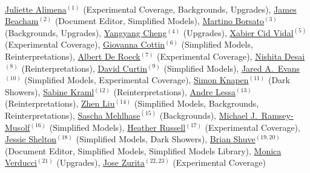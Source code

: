 

\\

\noindent  \href{mailto:juliette.alimena@cern.ch}{Juliette Alimena}$^{(1)}$ (Experimental Coverage, Backgrounds, Upgrades), \href{mailto:j.beacham@cern.ch}{James Beacham}$^{(2)}$ (Document Editor, Simplified Models), \href{mailto:martino.borsato@cern.ch}{Martino Borsato}$^{(3)}$ (Backgrounds, Upgrades),
\href{mailto:yangyang.cheng@cornell.edu}{Yangyang Cheng}$^{(4)}$ (Upgrades), \href{mailto:xabier.cid.vidal@cern.ch}{Xabier Cid Vidal}$^{(5)}$ (Experimental Coverage), \href{mailto:gcottin@phys.ntu.edu.tw}{Giovanna Cottin}$^{(6)}$ (Simplified Models, Reinterpretations), \href{mailto:deroeck@mail.cern.ch}{Albert De Roeck}$^{(7)}$ (Experimental Coverage), \href{mailto:ddesai@theory.tifr.res.in}{Nishita Desai}$^{(8)}$ (Reinterpretations), \href{mailto:dcurtin@physics.utoronto.ca}{David Curtin}$^{(9)}$ (Simplified Models), \href{mailto:jaredaevans@gmail.com}{Jared A.~Evans}$^{(10)}$ (Simplified Models, Experimental Coverage), \href{mailto:knapen@ias.edu}{Simon Knapen}$^{(11)}$ (Dark Showers), \href{mailto:sabine.kraml@lpsc.in2p3.fr}{Sabine Kraml}$^{(12)}$ (Reinterpretations), \href{mailto:andre.lessa@ufabc.edu.br}{Andre Lessa}$^{(13)}$ (Reinterpretations),  \href{mailto:zliuphys@umd.edu}{Zhen Liu}$^{(14)}$ (Simplified Models, Backgrounds, Reinterpretations), \href{mailto:sascha.mehlhase@cern.ch}{Sascha Mehlhase}$^{(15)}$ (Backgrounds), \href{mailto:mjrm@physics.umass.edu}{Michael J.~Ramsey-Musolf}$^{(16)}$ (Simplified Models),
\href{mailto:hrussell@cern.ch}{Heather Russell}$^{(17)}$ (Experimental Coverage), \href{mailto:sheltonj@illinois.edu}{Jessie Shelton}$^{(18)}$ (Simplified Models, Dark Showers), \href{mailto:bshuve@g.hmc.edu}{Brian Shuve}$^{(19,20)}$ (Document Editor, Simplified Models, Simplified Models Library),  \href{mailto:monica.verducci@cern.ch}{Monica Verducci}$^{(21)}$ (Upgrades), \href{mailto:jose.zurita@kit.edu}{Jose Zurita}$^{(22,23)}$ (Experimental Coverage)

\vspace{0.25cm}



\\

